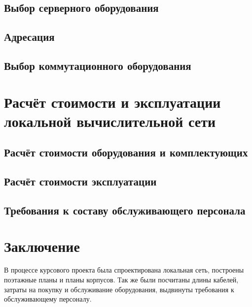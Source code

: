 \documentclass[a4paper,14pt,russian]{article}
\begin{document}
\subsection{Выбор серверного оборудования}


\subsection{Адресация}


\subsection{Выбор коммутационного оборудования}


\section{Расчёт стоимости и эксплуатации локальной вычислительной сети}

\subsection{Расчёт стоимости оборудования и комплектующих}


\subsection{Расчёт стоимости эксплуатации}


\subsection{Требования к составу обслуживающего персонала}


\section*{Заключение}
В процессе курсового проекта была спроектирована локальная сеть, построены поэтажные планы и планы корпусов. Так же были посчитаны длины кабелей, затраты на покупку и обслуживание оборудования, выдвинуты требования к обслуживающему персоналу.

\renewcommand\refname{Список использованных источников}
\nocite{*}


\end{document}
